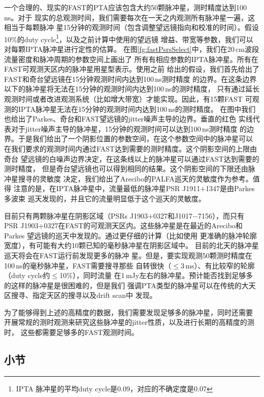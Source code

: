 一个合理的、现实的FAST的PTA应该包含大约50颗脉冲星，测时精度达到100\,ns。对于
现实的总观测时间，我们需要每次在一天之内观测所有脉冲星一遍，这相当于每颗脉冲
星15分钟的观测时间（包含调整望远镜指向和校准的时间）。假设10\%的duty cycle\footnote{IPTA
脉冲星的平均duty cycle是0.09，对应的不确定度是0.07}，以及之前计算中使用的望远镜
增益、带宽等参数，我们可以对每颗IPTA脉冲星进行定性的估算。
在图\ref{fg:fastPsrsSelect}中，我们在20\,cm波段流量密度和脉冲周期的参数空间上画出了
所有有相应参数的IPTA脉冲星。所有在FAST可观测天区内的脉冲星用星型表示。使用之前
给出的假设，我们首先给出了FAST和奇台望远镜在15分钟观测时间内达到100\,ns测时精度
的边界。在这条边界以下的脉冲星将无法在15分钟的观测时间内达到100\,ns的测时精度，
只有通过延长观测时间或者改进观测系统（比如增大带宽）才能实现。因此，有15颗FAST
可观测的IPTA脉冲星无法在15分钟的观测时间内达到100\,ns的测时精度。
在图中我们也给出了Parkes、奇台和FAST望远镜的jitter噪声主导的边界。垂直的红色
实线代表对于jitter噪声主导的脉冲星，15分钟的观测时间可以达到100\,ns测时精度
的边界。于是我们给出了一个阴影位置的参数空间，在这个参数空间中的脉冲星可以
在我们要求的观测时间内通过FAST达到需要的测时精度。这个阴影空间的上限由奇台
望远镜的白噪声边界决定，在这条线以上的脉冲星可以通过FAST达到需要的测时精度，
但是奇台望远镜也可以得到相同的结果。这个阴影空间的下限还由脉冲星搜寻的灵敏度
决定，我们给出了Arecibo的PALFA巡天的灵敏度作为参考\supercite{cfl+06}。值得
注意的是，在IPTA脉冲星中，流量最低的脉冲星PSR J1911$+$1347是由Parkes多波束
巡天发现的\supercite{fsk+04}，并且它的流量明显低于这个巡天的灵敏度。

目前只有两颗脉冲星在阴影区域（PSRs J1903$+$0327和J1017$-$7156），而只有
PSR J1903$+$0327在FAST的可观测天区内。这些脉冲星是在最近的Arecibo和Parkes
望远镜的巡天中发现的\supercite{crl+08,Keith12}。通过更仔细的计算（比如使用
更准确的脉冲轮廓宽度），有可能有大约10颗已知的毫秒脉冲星在阴影区域中。
目前的北天的脉冲星巡天\supercite{blr+13,ng13}将会在FAST运行前发现更多的脉冲
星。但是，要实现观测50颗测时精度在100\,ns的毫秒脉冲星，FAST需要搜寻那些
自转很快（$\le$3\,ms）、有比较窄的轮廓（duty cycle约$\le$10\%），同时流量
在1\,mJy左右的脉冲星。预计能否找到足够多的这样的脉冲星是很困难的，但是我们
强调PTA类型的脉冲星可以在传统的大天区搜寻、指定天区的搜寻以及drift scan中
发现。

为了能够得到上述的高精度的数据，我们需要发现足够多的脉冲星，同时还需要
开展常规的测时观测来研究这些脉冲星的jitter性质，以及进行长期的高精度的测时，
这些都需要足够多的FAST观测时间。

\subsection{小节}


